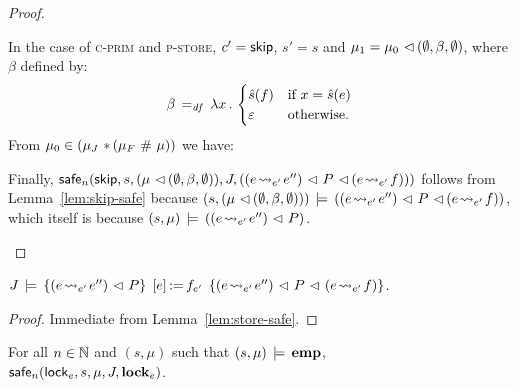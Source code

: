 \documentclass[11pt]{report}         %
\begin{document}
\begin{proof}
\begin{enumerate}
        In the case of \textsc{c-prim} and \textsc{p-store}, $c' = \cskip$, $s' = s$ and $\mu_1 = \mu_0 \fseq (\nil,\beta,\nil)$, where $\beta$ defined by: \[ \beta \eqdef \fun{x} \begin{cases}
          \ext{s}(f) & \text{if $x = \ext{s}(e)$} \\ 
          \lnil & \text{otherwise.}
        \end{cases}\] From $\mu_0 \in (\mu_J \fsep (\mu_F \fhash \mu))$ we have:        

         Finally, $\safe{n}{\cskip,s,(\mu \fseq (\nil,\beta,\nil)),J,((e \fwrite{e'} e'') \fseq P \fseq (e \fwrite{e'} f))}$ follows from Lemma~\ref{lem:skip-safe} because $(s,(\mu \fseq (\nil,\beta,\nil))) \sentails ((e \fwrite{e'} e'') \fseq P \fseq (e \fwrite{e'} f))$, which itself is because $(s,\mu) \sentails ((e \fwrite{e'} e'') \fseq P)$.  
    \end{enumerate}
\end{proof}

\begin{lemma}
    \label{lem:store-sound}
    $\truespec{J}{\left(e \fwrite{e'} e''\right) \fseq P}{\cstore{e}{f}_{e'}}{\left(e \fwrite{e'} e''\right) \fseq P \fseq \left(e \fwrite{e'} f\right)}$. 
\end{lemma} 

\begin{proof}
    Immediate from Lemma~\ref{lem:store-safe}. 
\end{proof}

\begin{lemma}
    \label{lem:lock-safe}
    For all $n \in \setnaturals$ and $(s,\mu)$ such that $(s,\mu) \sentails \femp$, \\ $\safe{n}{\clock_{e},s,\mu,J,\flock{e}}$. 
\end{lemma}
\end{document}

